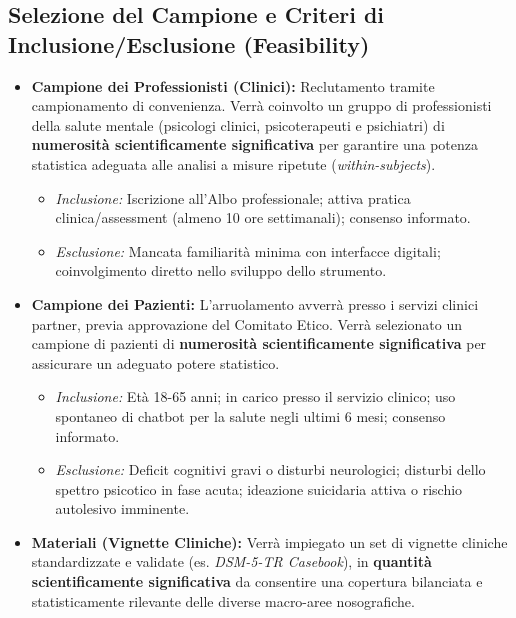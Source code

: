 \documentclass[11pt,a4paper]{article}
\begin{document}
\subsection{Selezione del Campione e Criteri di Inclusione/Esclusione (Feasibility)}
\begin{itemize}
    \item \textbf{Campione dei Professionisti (Clinici):} Reclutamento tramite campionamento di convenienza. Verrà coinvolto un gruppo di professionisti della salute mentale (psicologi clinici, psicoterapeuti e psichiatri) di \textbf{numerosità scientificamente significativa} per garantire una potenza statistica adeguata alle analisi a misure ripetute (\textit{within-subjects}).
    \begin{itemize}
        \item \textit{Inclusione:} Iscrizione all'Albo professionale; attiva pratica clinica/assessment (almeno 10 ore settimanali); consenso informato.
        \item \textit{Esclusione:} Mancata familiarità minima con interfacce digitali; coinvolgimento diretto nello sviluppo dello strumento.
    \end{itemize}
    
    \item \textbf{Campione dei Pazienti:} L'arruolamento avverrà presso i servizi clinici partner, previa approvazione del Comitato Etico. Verrà selezionato un campione di pazienti di \textbf{numerosità scientificamente significativa} per assicurare un adeguato potere statistico.
    \begin{itemize}
        \item \textit{Inclusione:} Età 18-65 anni; in carico presso il servizio clinico; uso spontaneo di chatbot per la salute negli ultimi 6 mesi; consenso informato.
        \item \textit{Esclusione:} Deficit cognitivi gravi o disturbi neurologici; disturbi dello spettro psicotico in fase acuta; ideazione suicidaria attiva o rischio autolesivo imminente.
    \end{itemize}
    
    \item \textbf{Materiali (Vignette Cliniche):} Verrà impiegato un set di vignette cliniche standardizzate e validate (es. \textit{DSM-5-TR Casebook}), in \textbf{quantità scientificamente significativa} da consentire una copertura bilanciata e statisticamente rilevante delle diverse macro-aree nosografiche.
\end{itemize}
\end{document}

